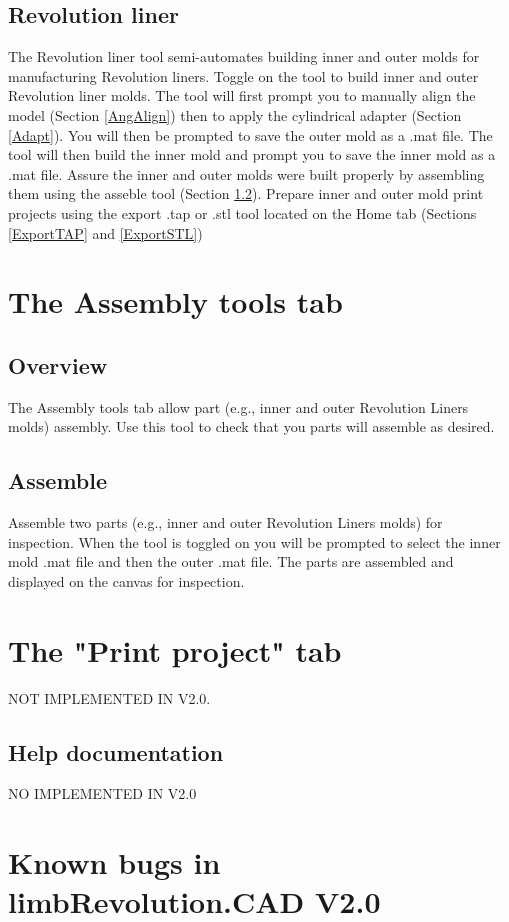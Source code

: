 \documentclass[twoside,a4paper]{refrep}
\begin{document}
	\subsection{Revolution liner}
	\label{RevLin}
	The Revolution liner tool semi-automates building inner and outer molds for manufacturing Revolution liners. Toggle on the tool to build inner and outer Revolution liner molds. The tool will first prompt you to manually align the model (Section \ref{AngAlign}) then to apply the cylindrical adapter (Section \ref{Adapt}). You will then be prompted to save the outer mold as a .mat file. The tool will then build the inner mold and prompt you to save the inner mold as a .mat file. Assure the inner and outer molds were built properly by assembling them using the asseble tool (Section \ref{Assem}). Prepare inner and outer mold print projects using the export .tap or .stl tool located on the Home tab (Sections \ref{ExportTAP} and \ref{ExportSTL})
	\section{The Assembly tools tab}
	\label{AssemTool}
	\subsection{Overview}
	The Assembly tools tab allow part (e.g., inner and outer Revolution Liners molds) assembly. Use this tool to check that you parts will assemble as desired. 
	\subsection{Assemble}
	\label{Assem}
	Assemble two parts (e.g., inner and outer Revolution Liners molds) for inspection. When the tool is toggled on you will be prompted to select the inner mold .mat file and then the outer .mat file. The parts are assembled and displayed on the canvas for inspection.
	\section{The "Print project" tab}
	NOT IMPLEMENTED IN V2.0.
	\subsection{Help documentation}
	NO IMPLEMENTED IN V2.0
	\section{Known bugs in limbRevolution.CAD V2.0}
\end{document}

